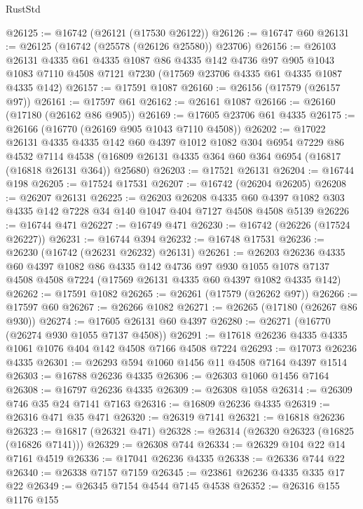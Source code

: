 \begin{lexlean}{RustStd}
\begin{coremodule}
{\begin{coremodule}
{{{{{{{{{{{{{{{{{{{{{{{{{{{{{{{{{{{{{{{{{{{{{{{{{{{{{{{@26125 := @16742 (@26121 (@17530 @26122))
@26126 := @16747 @60
@26131 := @26125 (@16742 (@25578 (@26126 @25580)) @23706)
@26156 := @26103
    @26131
    @4335
    @61
    @4335
    @1087
    @86
    @4335
    @142
    @4736
    @97
    @905
    @1043
    @1083
    @7110
    @4508
    @7121
    @7230
    (@17569 @23706 @4335 @61 @4335 @1087 @4335 @142)
@26157 := @17591 @1087
@26160 := @26156 (@17579 (@26157 @97))
@26161 := @17597 @61
@26162 := @26161 @1087
@26166 := @26160 (@17180 (@26162 @86 @905))
@26169 := @17605 @23706 @61 @4335
@26175 := @26166 (@16770 (@26169 @905 @1043 @7110 @4508))
@26202 := @17022
    @26131
    @4335
    @4335
    @142
    @60
    @4397
    @1012
    @1082
    @304
    @6954
    @7229
    @86
    @4532
    @7114
    @4538
    (@16809 @26131 @4335 @364 @60 @364 @6954 (@16817 (@16818 @26131 @364)) @25680)
@26203 := @17521 @26131
@26204 := @16744 @198
@26205 := @17524 @17531
@26207 := @16742 (@26204 @26205)
@26208 := @26207 @26131
@26225 := @26203
    @26208
    @4335
    @60
    @4397
    @1082
    @303
    @4335
    @142
    @7228
    @34
    @140
    @1047
    @404
    @7127
    @4508
    @4508
    @5139
@26226 := @16744 @471
@26227 := @16749 @471
@26230 := @16742 (@26226 (@17524 @26227))
@26231 := @16744 @394
@26232 := @16748 @17531
@26236 := @26230 (@16742 (@26231 @26232) @26131)
@26261 := @26203
    @26236
    @4335
    @60
    @4397
    @1082
    @86
    @4335
    @142
    @4736
    @97
    @930
    @1055
    @1078
    @7137
    @4508
    @4508
    @7224
    (@17569 @26131 @4335 @60 @4397 @1082 @4335 @142)
@26262 := @17591 @1082
@26265 := @26261 (@17579 (@26262 @97))
@26266 := @17597 @60
@26267 := @26266 @1082
@26271 := @26265 (@17180 (@26267 @86 @930))
@26274 := @17605 @26131 @60 @4397
@26280 := @26271 (@16770 (@26274 @930 @1055 @7137 @4508))
@26291 := @17618 @26236 @4335 @4335 @1061 @1076 @404 @142 @4508 @7166 @4508 @7224
@26293 := @17073 @26236 @4335
@26301 := @26293 @594 @1060 @1456 @11 @4508 @7164 @4397 @1514
@26303 := @16788 @26236 @4335
@26306 := @26303 @1060 @1456 @7164
@26308 := @16797 @26236 @4335
@26309 := @26308 @1058
@26314 := @26309 @746 @35 @24 @7141 @7163
@26316 := @16809 @26236 @4335
@26319 := @26316 @471 @35 @471
@26320 := @26319 @7141
@26321 := @16818 @26236
@26323 := @16817 (@26321 @471)
@26328 := @26314 (@26320 @26323 (@16825 (@16826 @7141)))
@26329 := @26308 @744
@26334 := @26329 @104 @22 @14 @7161 @4519
@26336 := @17041 @26236 @4335
@26338 := @26336 @744 @22
@26340 := @26338 @7157 @7159
@26345 := @23861 @26236 @4335 @335 @17 @22
@26349 := @26345 @7154 @4544 @7145 @4538
@26352 := @26316 @155 @1176 @155
}}}}}}}}}}}}}}}}}}}}}}}}}}}}}}}}}}}}}}}}}}}}}}}}}}}}}}}
\end{coremodule}}
\end{coremodule}
\end{lexlean}
